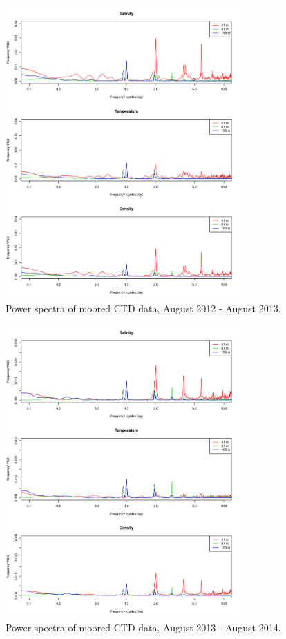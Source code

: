 \documentclass[12pt]{dforeport}
\begin{document}
\begin{figure}
\centering
\includegraphics[width = 0.8\textwidth]{./figures/11_mctd_ps_2012_2013.png}
\caption[Power spectra of moored CTD, 2012-2013]{Power spectra of moored CTD data, August 2012 - August 2013.}
\label{f:mctd_ps_2012_2013}
\end{figure}

\begin{figure}
\centering
\includegraphics[width = 0.8\textwidth]{./figures/12_mctd_ps_2013_2014.png}
\caption[Power spectra of moored CTD, 2013-2014]{Power spectra of moored CTD data, August 2013 - August 2014.}
\label{f:mctd_ps_2013_2014}
\end{figure}
\end{document}
